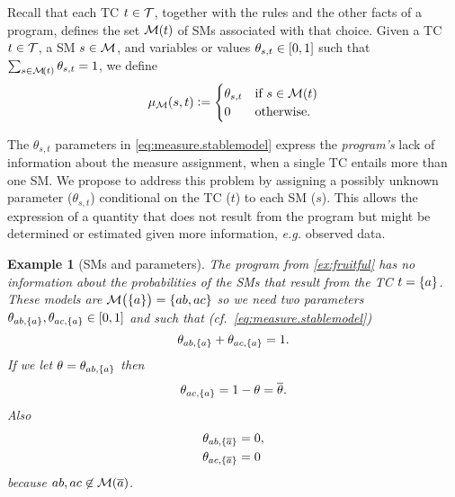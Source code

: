 \documentclass{tlp}
\newtheorem{example}{Example}
\newcommand{\at}[1]{\ensuremath{\!\del{#1}}}        %
\newcommand{\cla}[1]{\ensuremath{{\cal #1}}}        %
\newcommand{\co}[1]{\ensuremath{\overline{#1}}}     %
\newcommand{\TCHOICEset}{\ensuremath{\cla{T}}}
\newcommand{\MODELset}{\ensuremath{\cla{M}}}
\newcommand{\pwM}{\ensuremath{\mu_{\MODELset}}}
\newcommand{\pwm}[1]{\ensuremath{\pwM\at{#1}}}
\newcommand{\tcgen}[1]{\MODELset\at{#1}}
\newcommand{\franc}[1]{{\color{green!30!black}#1}}
\begin{document}
Recall that each \acl{TC} \(t \in \TCHOICEset\), together with the
rules and the other facts of a program, defines the set \tcgen{t} of
\aclp{SM} associated with that choice.  Given a \acl{TC}
\(t \in \TCHOICEset\), a \acl{SM} \(s \in \MODELset \), and variables
or values \(\theta_{s,t} \in \intcc{0, 1}\) such that
\(\sum_{s\in \tcgen{t}} \theta_{s,t} = 1\), we define
\begin{equation}
    \pwm{s, t} := \begin{cases}
        \theta_{s,t} & \text{if~} s \in \tcgen{t}\cr 0 & \text{otherwise.}
    \end{cases}
    \label{eq:measure.stablemodel}
\end{equation}

The \(\theta_{s,t}\) parameters in \cref{eq:measure.stablemodel}
express the \emph{program's} lack of information about the measure
assignment, when a single \acl{TC} entails more than one \acl{SM}.  We
propose to address this problem by assigning a possibly unknown
parameter (\(\theta_{s,t}\)) conditional on the \acl{TC} (\(t\)) to
each \acl{SM} (\(s\)).  This allows the expression of a quantity that
does not result from the program but might be determined or estimated
given more information, \textit{e.g.} observed data.

\franc{
    \begin{example}[\Aclp{SM} and parameters]%
      \label{ex:models.parameters}%
      \em %
      The program from \cref{ex:fruitful} has no information about the
      probabilities of the \aclp{SM} that result from the \acl{TC}
      \(t = \set{a}\).  These models are
      \(\MODELset\at{\set{a}} = \set{ab, ac}\) so we need two
      parameters
      \(\theta_{ab, \set{a}}, \theta_{ac, \set{a}} \in \intcc{0,1}\)
      and such that (\textit{cf.}\ \cref{eq:measure.stablemodel})
        \begin{equation*}
            \theta_{ab, \set{a}} + \theta_{ac, \set{a}} = 1.
        \end{equation*}
        If we let \(\theta = \theta_{ab, \set{a}}\) then
        \begin{equation*}
            \theta_{ac, \set{a}} = 1 - \theta = \co{\theta}.
        \end{equation*}
        Also
        \begin{equation*}
            \begin{split}
                \theta_{ab, \set{\co{a}}} &= 0,\\
                \theta_{ac, \set{\co{a}}} &= 0
            \end{split}
        \end{equation*}
        because \(ab, ac \not\in\MODELset\at{\co{a}}\).
    \end{example}
}
\end{document}
